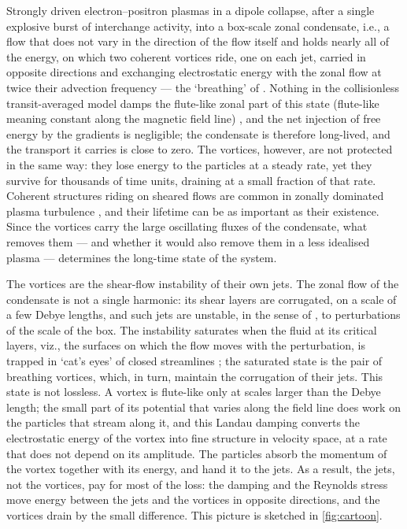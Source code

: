 \documentclass{jpp}
\begin{document}
Strongly driven electron--positron plasmas in a dipole collapse, after a single explosive burst of interchange activity, into a box-scale zonal condensate, i.e., a flow that does not vary in the direction of the flow itself and holds nearly all of the energy, on which two coherent vortices ride, one on each jet, carried in opposite directions and exchanging electrostatic energy with the zonal flow at twice their advection frequency --- the `breathing' of \citet{KennedyPlunkLetter}. Nothing in the collisionless transit-averaged model damps the flute-like zonal part of this state (flute-like meaning constant along the magnetic field line) \citep{KennedyPlunkManuscript, KennedyPlunkLetter}, and the net injection of free energy by the gradients is negligible; the condensate is therefore long-lived, and the transport it carries is close to zero. The vortices, however, are not protected in the same way: they lose energy to the particles at a steady rate, yet they survive for thousands of time units, draining at a small fraction of that rate. Coherent structures riding on sheared flows are common in zonally dominated plasma turbulence \citep{Ivanov2020, Ivanov2025}, and their lifetime can be as important as their existence. Since the vortices carry the large oscillating fluxes of the condensate, what removes them --- and whether it would also remove them in a less idealised plasma --- determines the long-time state of the system.

The vortices are the shear-flow instability of their own jets. The zonal flow of the condensate is not a single harmonic: its shear layers are corrugated, on a scale of a few Debye lengths, and such jets are unstable, in the sense of \citet{Rayleigh1880}, to perturbations of the scale of the box. The instability saturates when the fluid at its critical layers, viz., the surfaces on which the flow moves with the perturbation, is trapped in `cat's eyes' of closed streamlines \citep{ONeil1965, Stewartson1978, WarnWarn1978}; the saturated state is the pair of breathing vortices, which, in turn, maintain the corrugation of their jets. This state is not lossless. A vortex is flute-like only at scales larger than the Debye length; the small part of its potential that varies along the field line does work on the particles that stream along it, and this Landau damping \citep{Landau1946} converts the electrostatic energy of the vortex into fine structure in velocity space, at a rate that does not depend on its amplitude. The particles absorb the momentum of the vortex together with its energy, and hand it to the jets. As a result, the jets, not the vortices, pay for most of the loss: the damping and the Reynolds stress move energy between the jets and the vortices in opposite directions, and the vortices drain by the small difference. This picture is sketched in \cref{fig:cartoon}.
\end{document}
